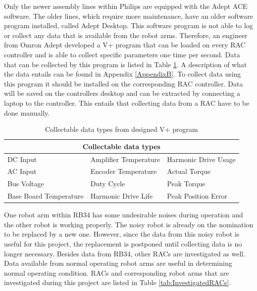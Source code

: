 Only the newer assembly lines within Philips are equipped with the Adept ACE software. The older lines, which require more maintenance, have an older software program installed, called Adept Desktop. This software program is not able to log or collect any data that is available from the robot arms. Therefore, an engineer from Omron Adept developed a V+ program that can be loaded on every RAC controller and is able to collect specific parameters one time per second. Data that can be collected by this program is listed in Table \ref{tab:CollectableData}. A description of what the data entails can be found in Appendix \ref{AppendixB}. To collect data using this program it should be installed on the corresponding RAC controller. Data will be saved on the controllers desktop and can be extracted by connecting a laptop to the controller. This entails that collecting data from a RAC have to be done manually.

\begin{table}[ht]
\begin{center}
\caption[Collectable data types from designed V+ program]{Collectable data types from designed V+ program} \label{tab:CollectableData}
\begin{tabular}[width=\textwidth]{p{}|p{}|p{}}
\multicolumn{3}{c}{Collectable data types} \\
\hline
DC Input & Amplifier Temperature & Harmonic Drive Usage \\
AC Input & Encoder Temperature & Actual Torque \\
Bus Voltage & Duty Cycle & Peak Torque \\
Base Board Temperature & Harmonic Drive Life &Peak Position Error \\
\end{tabular}
\end{center}
\end{table}

One robot arm within RB34 has some undesirable noises during operation and the other robot is working properly. The noisy robot is already on the nomination to be replaced by a new one. However, since the data from this noisy robot is useful for this project, the replacement is postponed until collecting data is no longer necessary. Besides data from RB34, other RACs are investigated as well. Data available from normal operating robot arms are useful in determining normal operating condition. RACs and corresponding robot arms that are investigated during this project are listed in Table \ref{tab:InvestigatedRACs}.

